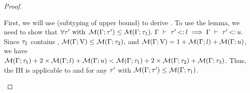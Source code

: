 \begin{proof}
\begin{itemize}
            First, we will use  
            (subtyping of upper bound) to derive
            . To use the lemma, we need to
            show that $\forall \ty' \text{ with } 
            \tymsrdflt{\ty'} \leq \tymsrdflt{\ty_1}.\ 
            \subtydflt{\ty'}{\tylb} \implies \subtydflt{\ty'}{\tyub}.$
            Since $\tau_2$ contains \vany,
            $\operatorname{\mathcal{M}}(\Gamma;\mathrm{V}) \leq \operatorname{\mathcal{M}}(\Gamma;\tau_2),$
            and $\operatorname{\mathcal{M}}(\Gamma;\mathrm{V}) = 
            1 + \operatorname{\mathcal{M}}(\Gamma;l) + \operatorname{\mathcal{M}}(\Gamma;u)$, we have
            $\operatorname{\mathcal{M}}(\Gamma;\tau_1) + 2\times\operatorname{\mathcal{M}}(\Gamma;l) + 
            \operatorname{\mathcal{M}}(\Gamma;u) < \operatorname{\mathcal{M}}(\Gamma;\tau_1) + 
            2\times\operatorname{\mathcal{M}}(\Gamma;\tau_2) + \operatorname{\mathcal{M}}(\Gamma;\tau_3)$. Thus,
            the IH is applicable to \subtydflt{\ty'}{\tylb} and
            \subtydflt{\tylb}{\tyub} for any $\tau'$ with
            $\operatorname{\mathcal{M}}(\Gamma;\tau') \leq \operatorname{\mathcal{M}}(\Gamma;\tau_1)$.


\end{itemize}
\end{proof}
